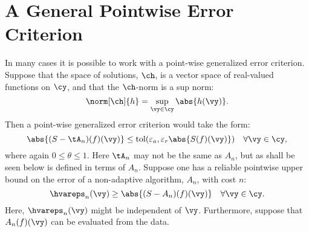 \documentclass[]{elsarticle}
\DeclareMathOperator{\tol}{tol}
\theoremstyle{definition}
\theoremstyle{remark}
\begin{document}
\section{A General Pointwise Error Criterion} \label{pointerrsec}

In many cases it is possible to work with a point-wise generalized error criterion.  Suppose that the space of solutions, $\ch$, is a vector space of real-valued functions on $\cy$, and that the $\ch$-norm is a sup norm:
\begin{equation}
\norm[\ch]{h} = \sup_{\vy \in \cy} \abs{h(\vy)}.
\end{equation}
Then a point-wise generalized error criterion would take the form:
\begin{equation} \label{localgenerrcrit}
\abs{(S-\tA_n)(f)(\vy)} \le \tol(\varepsilon_a, \varepsilon_r \abs{S(f)(\vy)}) \quad \forall \vy \in \cy,
\end{equation}
where again $0 \le \theta \le 1$.  Here $\tA_n$ may not be the same as $A_n$, but as shall be seen below is defined in terms of $A_n$.
Suppose one has a reliable pointwise upper bound on the error of a non-adaptive algorithm, $A_n$, with cost $n$:
\begin{equation} \label{hatvareps}
\hvareps_n(\vy) \ge \abs{(S-A_n)(f) (\vy)} \quad \forall \vy \in \cy.
\end{equation}
Here, $\hvareps_n(\vy)$ might be independent of $\vy$. Furthermore, suppose that $A_n(f)(\vy)$ can be evaluated from the data.
\end{document}
